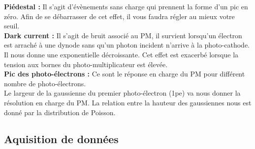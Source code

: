 \textbf{Piédestal :} Il s'agit d'évènements sans charge qui prennent la forme d'un pic en zéro. Afin de se débarrasser de cet effet, il vous faudra régler au mieux votre seuil.\\

\textbf{Dark current :} Il s'agit de bruit associé au PM, il survient lorsqu'un électron est arraché à une dynode sans qu'un photon incident n'arrive à la photo-cathode. Il nous donne une exponentielle décroissante. Cet effet est exacerbé lorsque la tension aux bornes du photo-multiplicateur est élevée. \\

\textbf{Pic des photo-électrons :} Ce sont le réponse en charge du PM pour différent nombre de photo-électrons.\\

Le largeur de la gaussienne du premier photo-électron (1pe) va nous donner la résolution en charge du PM. La relation entre la hauteur des gaussiennes nous est donné par la distribution de Poisson.

\subsection{Aquisition de donn{\'e}es}

